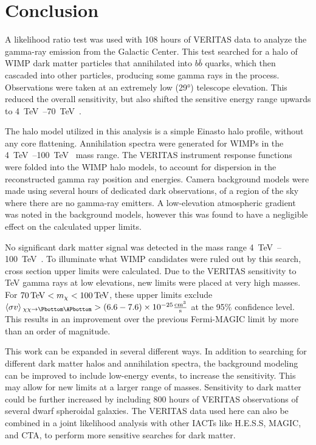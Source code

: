\cleartooddpage[\thispagestyle{empty}]
\chapter{Conclusion}

A likelihood ratio test was used with 108 hours of VERITAS data to analyze the gamma-ray emission from the Galactic Center.
This test searched for a halo of WIMP dark matter particles that annihilated into $b\bar{b}$ quarks, which then cascaded into other particles, producing some gamma rays in the process.
Observations were taken at an extremely low (\nicetilde{}\ang{29}) telescope elevation.
This reduced the overall sensitivity, but also shifted the sensitive energy range upwards to \SIrange{4}{70}{\TeV{}}.

The halo model utilized in this analysis is a simple Einasto halo profile, without any core flattening.
Annihilation spectra were generated for WIMPs in the \SIrange{4}{100}{\TeV{}} mass range.
The VERITAS instrument response functions were folded into the WIMP halo models, to account for dispersion in the reconstructed gamma ray position and energies.
Camera background models were made using several hours of dedicated dark observations, of a region of the sky where there are no gamma-ray emitters.
A low-elevation atmospheric gradient was noted in the background models, however this was found to have a negligible effect on the calculated upper limits.

No significant dark matter signal was detected in the mass range \SIrange{4}{100}{\TeV{}}.
To illuminate what WIMP candidates were ruled out by this search, cross section upper limits were calculated.
Due to the VERITAS sensitivity to TeV gamma rays at low elevations, new limits were placed at very high masses.
For $70\,\TeV<m_{\chi}<100\,\TeV$, these upper limits exclude ${\vacs{}_{\chi\chi\rightarrow\Pbottom\APbottom} > \left ( 6.6-7.6 \right ) \times 10^{-25} \frac{\mathrm{cm}^3}{\mathrm{s}}}$ at the 95\% confidence level.
This results in an improvement over the previous Fermi-MAGIC limit by more than an order of magnitude.

This work can be expanded in several different ways.
In addition to searching for different dark matter halos and annihilation spectra, the background modeling can be improved to include low-energy events, to increase the sensitivity.
This may allow for new limits at a larger range of masses.
Sensitivity to dark matter could be further increased by including \nicetilde{}800 hours of VERITAS observations of several dwarf spheroidal galaxies.
The VERITAS data used here can also be combined in a joint likelihood analysis with other IACTs like H.E.S.S, MAGIC, and CTA, to perform more sensitive searches for dark matter.

